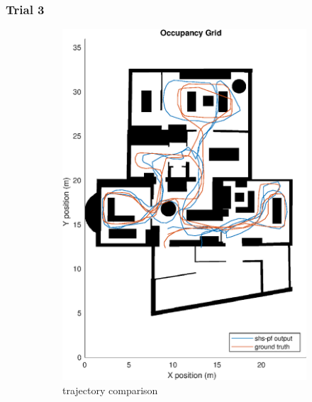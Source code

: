 \subsubsection{Trial 3}
\begin{figure}[H]
	\centering
	\begin{subfigure}[t]{.45\textwidth}
		\centering
		\includegraphics[width=0.9\linewidth]{images/20201029_1804_shs-pf_trial_3_2}
		\caption{trajectory comparison}
		\label{fig:shspf_trial3_on_map}
	\end{subfigure}
	\begin{subfigure}[t]{.45\textwidth}
		\centering

\end{subfigure}
\end{figure}
